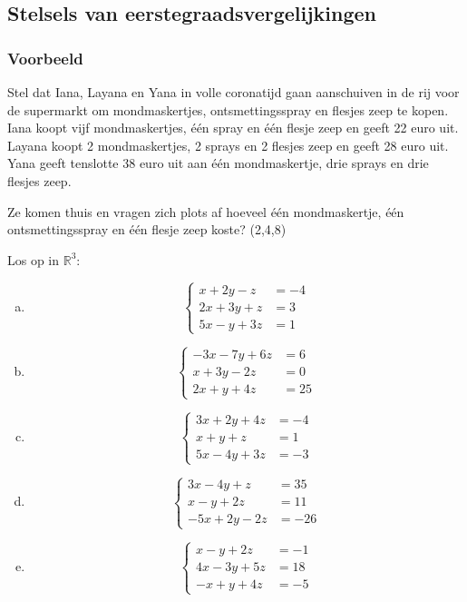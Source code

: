 \documentclass[12pt,twoside]{article}
\begin{document}
\subsection{Stelsels van eerstegraadsvergelijkingen}

\subsubsection{Voorbeeld}

Stel dat Iana, Layana en Yana in volle coronatijd gaan aanschuiven in de rij voor de supermarkt om mondmaskertjes, ontsmettingsspray en flesjes zeep te kopen. Iana koopt vijf mondmaskertjes, één spray en één flesje zeep en geeft 22 euro uit. Layana koopt 2 mondmaskertjes, 2 sprays en 2 flesjes zeep en geeft 28 euro uit. Yana geeft tenslotte 38 euro uit aan één mondmaskertje, drie sprays en drie flesjes zeep.

Ze komen thuis en vragen zich plots af hoeveel één mondmaskertje, één ontsmettingsspray en één flesje zeep koste? (2,4,8)

\begin{oefening}
Los op in $\mathbb{R}^3$:
\begin{multicols}{2}
\begin{enumerate}[(a)]
  \item$$\left\{
\begin{aligned}
  x + 2y -z &= -4\\
  2x+3y+z   &= 3\\
  5x-y+3z   &= 1
\end{aligned}\right.$$
  \item$$\left\{
\begin{aligned}
  -3x -7y +6z &= 6\\
  x+3y-2z   &= 0\\
  2x+y+4z   &= 25
\end{aligned}\right.$$
  \item$$\left\{
\begin{aligned}
  3x +2y +4z &= -4\\
  x+y+z   &= 1\\
  5x-4y+3z   &= -3
\end{aligned}\right.$$
  \item$$\left\{
\begin{aligned}
  3x -4y +z &= 35\\
  x-y+2z   &= 11\\
  -5x+2y-2z   &= -26
\end{aligned}\right.$$
  \item$$\left\{
\begin{aligned}
  x -y + 2z &= -1\\
  4x-3y+5z   &= 18\\
  -x+y+4z   &= -5
\end{aligned}\right.$$
\end{enumerate}
\end{multicols}
\end{oefening}
\end{document}
